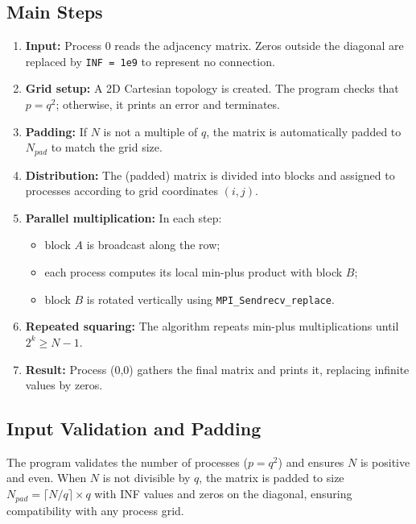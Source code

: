 \documentclass[10pt,a4paper]{article}
\begin{document}
\subsection{Main Steps}
\begin{enumerate}
  \item \textbf{Input:}  
  Process 0 reads the adjacency matrix. Zeros outside the diagonal are replaced by \texttt{INF = 1e9} to represent no connection.
  
  \item \textbf{Grid setup:}  
  A 2D Cartesian topology is created. The program checks that \(p = q^2\); otherwise, it prints an error and terminates.
  \item \textbf{Padding:}  
  If \(N\) is not a multiple of \(q\), the matrix is automatically padded to \(N_{pad}\) to match the grid size.
  
  \item \textbf{Distribution:}  
  The (padded) matrix is divided into blocks and assigned to processes according to grid coordinates \((i, j)\).
  \item \textbf{Parallel multiplication:}  
  In each step:
  \begin{itemize}[noitemsep]
    \item block \(A\) is broadcast along the row;
    \item each process computes its local min-plus product with block \(B\);
    \item block \(B\) is rotated vertically using \texttt{MPI\_Sendrecv\_replace}.
  \end{itemize}
\item \textbf{Repeated squaring:}  
  The algorithm repeats min-plus multiplications until \(2^k \ge N-1\).

\item \textbf{Result:}  
  Process (0,0) gathers the final matrix and prints it, replacing infinite values by zeros.
\end{enumerate}

 \subsection*{Input Validation and Padding}
The program validates the number of processes (\(p=q^2\)) and ensures \(N\) is positive and even.  
When \(N\) is not divisible by \(q\), the matrix is padded to size \(N_{pad} = \lceil N/q \rceil \times q\) with INF values and zeros on the diagonal, ensuring compatibility with any process grid.
\end{document}
